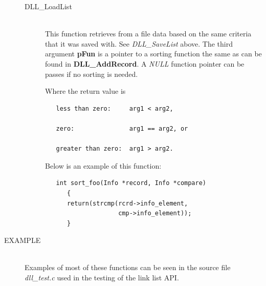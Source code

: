\documentclass[10pt,letterpaper,titlepage]{article}
\begin{document}
\begin{description}
\begin{description}
 \item[DLL\_LoadList]\quad\\
 This function retrieves from a file data based on the same criteria that it was saved with.  See \emph{DLL\_SaveList} above.  The third argument \textbf{pFun} is a pointer to a sorting function the same as can be found in \textbf{DLL\_AddRecord}.  A \emph{NULL} function pointer can be passes if no sorting is needed.
 \vspace{8pt}

 Where the return value is
 \begin{verbatim}
   less than zero:     arg1 < arg2,

   zero:               arg1 == arg2, or

   greater than zero:  arg1 > arg2.
 \end{verbatim}

 Below is an example of this function:

 \begin{verbatim}
   int sort_foo(Info *record, Info *compare)
      {
      return(strcmp(rcrd->info_element,
                    cmp->info_element));
      }
 \end{verbatim}

 
 \end{description}

\item[EXAMPLE]\quad\\
Examples of most of these functions can be seen in the source file \emph{dll\_test.c} used in the testing of the link list API.
\end{description}
\end{document}
